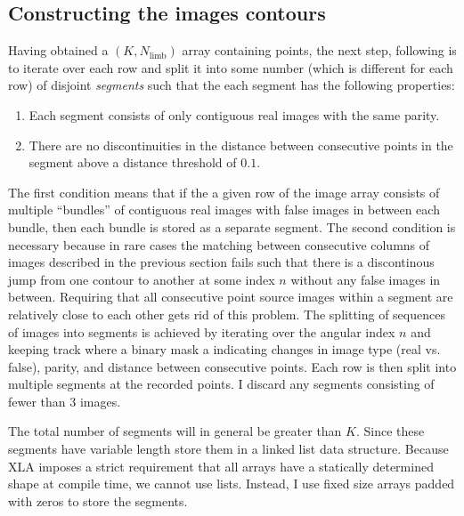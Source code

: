 \documentclass[12pt,dvipsnames]{report}
\newcommand{\ssf}[1]{\textsf{#1}}
\begin{document}
\subsection{Constructing the images contours}
\label{ssec:constructing_contours}
Having obtained a $(K, N_\mathrm{limb})$ array containing points, the next step, following 
\citet{2021MNRAS.503.6143K} is to iterate over each row and split it into some number 
(which is different for each row) of disjoint \emph{segments} such that the each segment has 
the following properties:
\begin{enumerate}
    \item Each segment consists of only contiguous real images with the same parity. 
    \item There are no discontinuities in the distance between consecutive points in the 
    segment above a distance threshold of $0.1$.
\end{enumerate}
The first condition means that if the a given row of the image array consists
of multiple ``bundles'' of contiguous real images with false images in between each bundle, 
then each bundle is stored as a separate segment. The second condition is necessary because
in rare cases the matching between consecutive columns of images described in the previous 
section fails such that there is a discontinous jump from one contour to another at some 
index $n$ without any false images in between. Requiring that all consecutive point 
source images within a segment are relatively close to each other gets rid of this problem.
The splitting of sequences of images into segments is achieved by iterating over the angular 
index $n$ and keeping track where a binary mask a indicating changes in image type 
(real vs. false), parity, and distance between consecutive points. Each row is then split
into multiple segments at the recorded points. I discard any segments  consisting  of 
fewer than 3 images.

The total number of segments will in general be greater than $K$. Since these segments have 
variable length \citet{2021MNRAS.503.6143K} store them in a 
\ssf{linked list} data structure. Because \ssf{XLA} imposes a strict requirement that all 
arrays have a statically determined shape at compile time, we cannot use lists. Instead, 
I use fixed size arrays padded with zeros to store the segments. 
\end{document}
